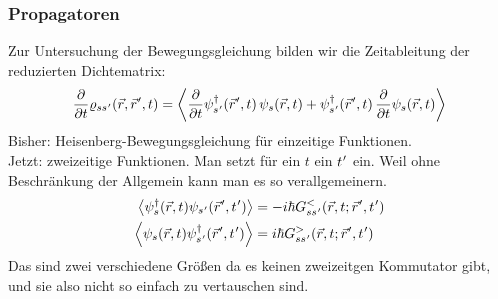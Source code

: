 \subsubsection*{Propagatoren}
Zur Untersuchung der Bewegungsgleichung bilden wir die Zeitableitung der reduzierten Dichtematrix:
\begin{equation}
  \frac{\partial}{\partial t} \varrho_{ss\mkern1mu'}(\vec{r},\vec{r}\mkern1mu',t)
  = \left\langle\frac{\partial}{\partial t}\psi^\dagger_{s\mkern1mu'}(\vec{r}\mkern1mu',t)\,\psi_s(\vec{r},t)
    + \psi^\dagger_{s\mkern1mu'}(\vec{r}\mkern1mu',t)\,\frac{\partial}{\partial t}\psi_s(\vec{r},t)\right\rangle
\end{equation}
Bisher: Heisenberg-Bewegungsgleichung für einzeitige Funktionen.  \\
Jetzt: zweizeitige Funktionen. Man setzt für ein $t$ ein $t\mkern1mu'$ ein. Weil ohne Beschränkung der Allgemein kann man es so verallgemeinern.
\begin{equation}\label{propagatoren}
  \begin{aligned}
    \left\langle\psi^\dagger_s(\vec{r},t)\psi_{s\mkern1mu'}(\vec{r}\mkern1mu',t\mkern1mu')\right\rangle
     & = -i \hbar G^{<}_{ss\mkern1mu'}(\vec{r},t; \vec{r}\mkern1mu',t\mkern1mu') \\
    \left\langle\psi_s(\vec{r},t)\psi^\dagger_{s\mkern1mu'}(\vec{r}\mkern1mu',t\mkern1mu')\right\rangle
     & = i \hbar G^{>}_{ss\mkern1mu'}(\vec{r},t; \vec{r}\mkern1mu',t\mkern1mu')
  \end{aligned}
\end{equation}
Das sind zwei verschiedene Größen da es keinen zweizeitgen Kommutator gibt, und sie also nicht so einfach zu vertauschen sind.

